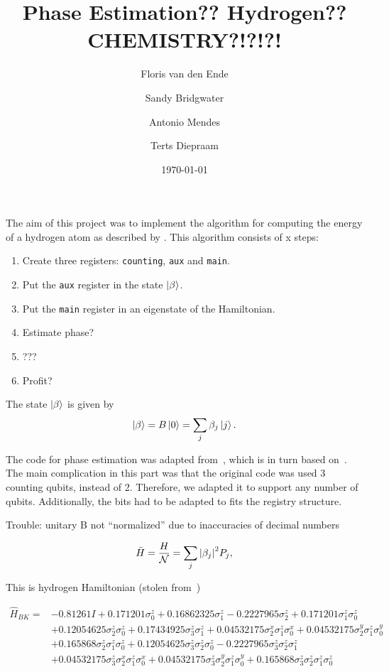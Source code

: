 \documentclass{article}
\title{Phase Estimation?? Hydrogen?? CHEMISTRY?!?!?!}
\author{Floris van den Ende\and Sandy Bridgwater\and Antonio Mendes\and Terts Diepraam}
\date{\today}
\begin{document}
\maketitle

The aim of this project was to implement the algorithm for computing the energy of a hydrogen atom as described by \textcite{poulin}. This algorithm consists of x steps:
\begin{enumerate}
	\item Create three registers: \verb|counting|, \verb|aux| and \verb|main|.
	\item Put the \verb|aux| register in the state $\ket{\beta}$.
	\item Put the \verb|main| register in an eigenstate of the Hamiltonian.
	\item Estimate phase?
	\item ???
	\item Profit?
\end{enumerate}

The state $\ket\beta$ is given by
\[ \ket\beta = B\ket 0 = \sum_j \beta_j \ket j. \]

The code for phase estimation was adapted from~\cite{Qiskit-Textbook}, which is in turn based on~\textcite{nielsen}. The main complication in this part was that the original code was used 3 counting qubits, instead of 2. Therefore, we adapted it to support any number of qubits. Additionally, the bits had to be adapted to fits the registry structure.

Trouble: unitary B not ``normalized'' due to inaccuracies of decimal numbers

\begin{equation}
	\bar H = \frac H{\mathcal{N}} = \sum_j\abs{\beta_j}^2 P_j,
\end{equation}

This is hydrogen Hamiltonian (stolen from~\cite{seeley})

\begin{align*}
\hat{H}_{B K}=&-0.81261 I+0.171201 \sigma_{0}^{z}+0.16862325 \sigma_{1}^{z}-0.2227965 \sigma_{2}^{z}+0.171201 \sigma_{1}^{z} \sigma_{0}^{z} \\
&+0.12054625 \sigma_{2}^{z} \sigma_{0}^{z}+0.17434925 \sigma_{3}^{z} \sigma_{1}^{z}+0.04532175 \sigma_{2}^{x} \sigma_{1}^{z} \sigma_{0}^{x}+0.04532175 \sigma_{2}^{y} \sigma_{1}^{z} \sigma_{0}^{y} \\
&+0.165868 \sigma_{2}^{z} \sigma_{1}^{z} \sigma_{0}^{z}+0.12054625 \sigma_{3}^{z} \sigma_{2}^{z} \sigma_{0}^{z}-0.2227965 \sigma_{3}^{z} \sigma_{2}^{z} \sigma_{1}^{z} \\
&+0.04532175 \sigma_{3}^{z} \sigma_{2}^{x} \sigma_{1}^{z} \sigma_{0}^{x}+0.04532175 \sigma_{3}^{z} \sigma_{2}^{y} \sigma_{1}^{z} \sigma_{0}^{y}+0.165868 \sigma_{3}^{z} \sigma_{2}^{z} \sigma_{1}^{z} \sigma_{0}^{z}
\end{align*}
\end{document}
